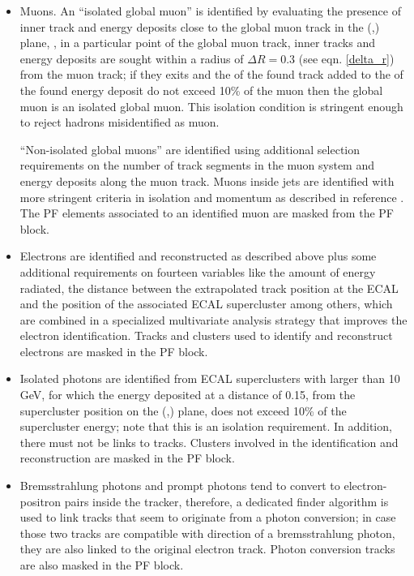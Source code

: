 \begin{itemize}

\item Muons. An ``isolated global muon'' is identified by evaluating the presence of inner track and energy deposits close to the global muon track in the (\etac,\phic) plane, \ie, in a particular point of the global muon track, inner tracks and energy deposits are sought within a radius of $\Delta R=0.3$ (see eqn. \ref{delta_r}) from the muon track; if they exits and the \pt of the found track added to the \Et of the found energy deposit do not exceed 10\% of the muon \pt then the global muon is an isolated global muon. This isolation condition is stringent enough to reject hadrons misidentified as muon.

  ``Non-isolated global muons'' are identified using additional selection requirements on the number of track segments in the muon system and energy deposits along the muon track. Muons inside jets are identified with more stringent criteria in isolation and momentum as described in reference \cite{muon_req}. The PF elements associated to an identified muon are masked from the PF block.  


\item Electrons are identified and reconstructed as described above plus some additional requirements on fourteen variables like the amount of energy radiated, the distance between the extrapolated track position at the ECAL and the position of the associated ECAL supercluster among others, which are combined in a specialized multivariate analysis strategy that improves the electron identification. Tracks and clusters used to identify and reconstruct electrons are masked in the PF block.  
  
\item Isolated photons are identified from ECAL superclusters with \Et larger than 10 GeV, for which the energy deposited at a distance of 0.15, from the supercluster position on the (\etac,\phic) plane, does not exceed 10\% of the supercluster energy; note that this is an isolation requirement. In addition, there must not be links to tracks. Clusters involved in the identification and reconstruction are masked in the PF block.

\item Bremsstrahlung photons and prompt photons tend to convert to electron-positron pairs inside the tracker, therefore, a dedicated finder algorithm is used to link tracks that seem to originate from a photon conversion; in case those two tracks are compatible with direction of a bremsstrahlung photon, they are also linked to the original electron track. Photon conversion tracks are also masked in the PF block.


\end{itemize}
